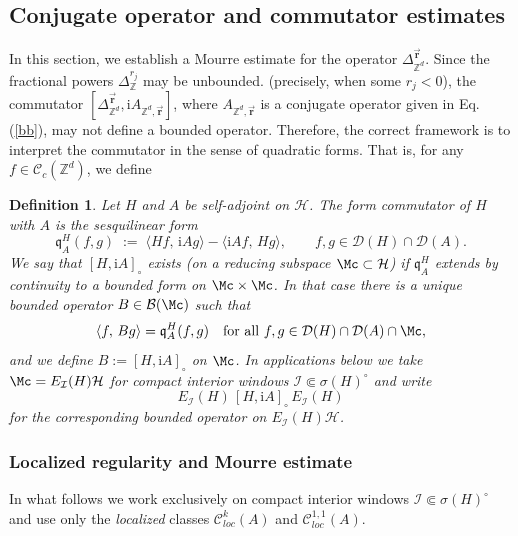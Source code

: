 \documentclass[10pt]{amsart} %
\newcommand{\Z}{{\mathbb{Z}}}
\newcommand{\1}{{\mathbb{I}}}
\newcommand{\Bc}{\mathcal{B}}
\newcommand{\Dc}{\mathcal{D}}
\newcommand{\Hc}{\mathcal{H}}
\newcommand{\Ic}{\mathcal{I}}
\numberwithin{equation}{section}
\newtheorem{definition}[theorem]{Definition}%
\begin{document}
\subsection{Conjugate operator and commutator estimates }

In this section, we establish a Mourre estimate for the operator \( \Delta_{\Z^d}^{\vec{\mathbf{r}}} \).
Since the fractional powers \( \Delta^{r_j}_{\mathbb{Z}} \) may be unbounded.
(precisely, when some \( r_j < 0 \)), the commutator \( [\Delta_{\Z^d}^{\vec{\mathbf{r}}}, \mathrm{i}A_{\mathbb{Z}^d,\vec{\mathbf{r}}}] \), where $A_{\mathbb{Z}^d,\vec{\mathbf{r}}}$ is a conjugate operator given  in Eq. (\ref{bb}),
may not define a bounded operator. Therefore, the correct framework is to interpret the commutator
in the sense of quadratic forms. That is, for any \( f \in \mathcal{C}_c(\mathbb{Z}^d) \), we define
\begin{definition}\label{def:form-commutator}
Let $H$ and $A$ be self-adjoint on $\Hc$. The \emph{form commutator} of $H$ with $A$ is the sesquilinear form
\[
\mathfrak q_A^H(f,g)\;:=\;\langle Hf,\,\mathrm i A g\rangle-\langle \mathrm i A f,\,Hg\rangle,
\qquad f,g\in\Dc(H)\cap\Dc(A).
\]
We say that $[H,\mathrm i A]_\circ$ exists (on a reducing subspace $\Mc\subset\Hc$) if $\mathfrak q_A^H$ extends by continuity
to a bounded form on $\Mc\times\Mc$. In that case there is a unique bounded operator $B\in\Bc(\Mc)$ such that
\[
\langle f,\,B g\rangle=\mathfrak q_A^H(f,g)\quad\text{for all }f,g\in\Dc(H)\cap\Dc(A)\cap\Mc,
\]
and we \emph{define} $B:= [H,\mathrm i A]_\circ$ on $\Mc$.
In applications below we take $\Mc=E_\Ic(H)\Hc$ for compact interior windows $\Ic\Subset\sigma(H)^\circ$ and write
\[
E_\Ic(H)\,[H,\mathrm i A]_\circ\,E_\Ic(H)
\]
for the corresponding bounded operator on $E_\Ic(H)\Hc$.
\end{definition}
\subsubsection{Localized regularity and Mourre estimate }\label{subsec:loc-classes}
In what follows we work exclusively on compact interior windows
\(\Ic\Subset\sigma(H)^\circ\) and use only the \emph{localized} classes
\(\mathcal C^k_{loc}(A)\) and \(\mathcal C^{1,1}_{loc}(A)\).
\end{document}
